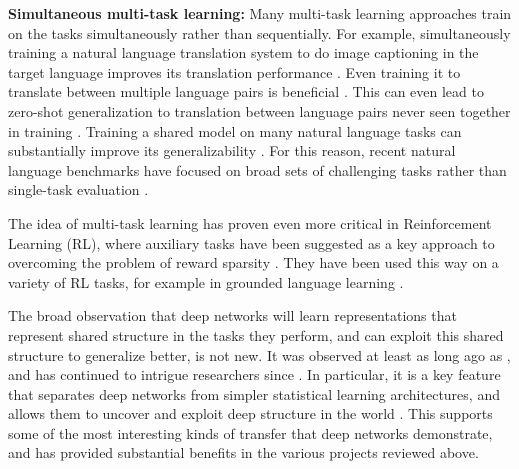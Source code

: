 \textbf{Simultaneous multi-task learning:} Many multi-task learning approaches train on the tasks simultaneously rather than sequentially. For example, simultaneously training a natural language translation system to do image captioning in the target language improves its translation performance \citep{Luong2016}. Even training it to translate between multiple language pairs is beneficial \citep{Dong2015}. This can even lead to zero-shot generalization to translation between language pairs never seen together in training \citep{Johnson2016a, Platanios2017}. Training a shared model on many natural language tasks can substantially improve its generalizability \citep{Raffel2019}. For this reason, recent natural language benchmarks have focused on broad sets of challenging tasks rather than single-task evaluation \citep{Wang2019,Wang2019b}.\par 
The idea of multi-task learning has proven even more critical in Reinforcement Learning (RL), where auxiliary tasks have been suggested as a key approach to overcoming the problem of reward sparsity \citep[e.g.][]{LeCun2016}. They have been used this way on a variety of RL tasks, for example in grounded language learning \citep{Hermann2017}. \par
The broad observation that deep networks will learn representations that represent shared structure in the tasks they perform, and can exploit this shared structure to generalize better, is not new. It was observed at least as long ago as \citet{Hinton1986}, and has continued to intrigue researchers since \citep[e.g.][]{Lampinen2017a}. In particular, it is a key feature that separates deep networks from simpler statistical learning architectures, and allows them to uncover and exploit deep structure in the world \citep{Rogers2008}. This supports some of the most interesting kinds of transfer that deep networks demonstrate, and has provided substantial benefits in the various projects reviewed above. \par 

